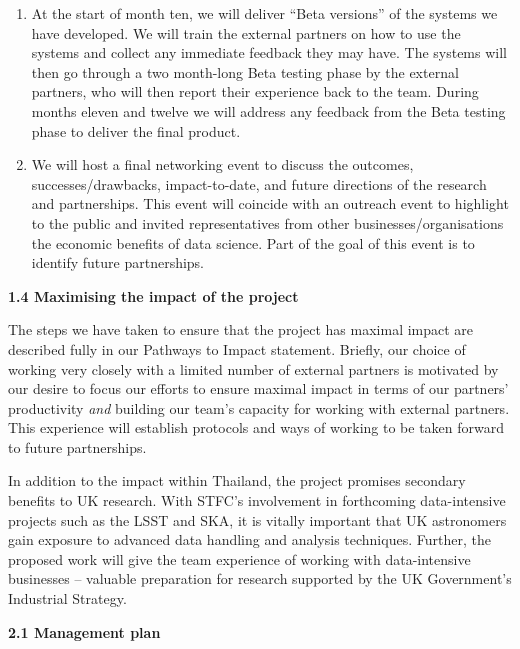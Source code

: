 \documentclass[11pt]{article}
\begin{document}
\begin{enumerate}[leftmargin=6mm,itemsep=-3pt,topsep=1pt]
  \item At the start of month ten, we will deliver ``Beta versions'' of the systems we have developed. We will train the external partners on how to use the systems and collect any immediate feedback they may have. The systems will then go through a two month-long Beta testing phase by the external partners, who will then report their experience back to the team. During months eleven and twelve we will address any feedback from the Beta testing phase to deliver the final product.
  \item We will host a final networking event to discuss the outcomes, successes/drawbacks, impact-to-date, and future directions of the research and partnerships. This event will coincide with an outreach event to highlight to the public and invited representatives from other businesses/organisations the economic benefits of data science. Part of the goal of this event is to identify future partnerships.
  \end{enumerate}
  
  \vspace{3mm}
  \noindent
  {\large \bf 1.4 Maximising the impact of the project}
  
  \noindent
  The steps we have taken to ensure that the project has maximal impact are described fully in our Pathways to Impact statement. Briefly, our choice of working very closely with a limited number of external partners is motivated by our desire to focus our efforts to ensure maximal impact in terms of our partners' productivity {\it and} building our team's capacity for working with external partners. This experience will establish protocols and ways of working to be taken forward to future partnerships.

  \vspace{2mm}
  \noindent
  In addition to the impact within Thailand, the project promises secondary benefits to UK research. With STFC's involvement in forthcoming data-intensive projects such as the LSST and SKA, it is vitally important that UK astronomers gain exposure to advanced data handling and analysis techniques. Further, the proposed work will give the team experience of working with data-intensive businesses -- valuable preparation for research supported by the UK Government's Industrial Strategy.
  
  \vspace{3mm}
  \noindent
  {\large \bf 2.1 Management plan}
    
\end{document}
